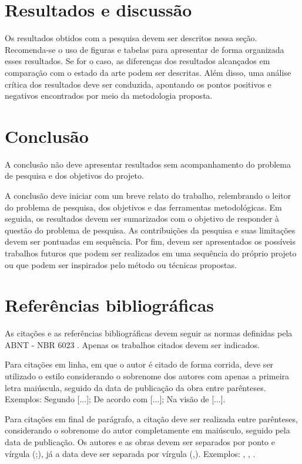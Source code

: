 \documentclass[
	article,			%
	11pt,				%
	oneside,			%
	a4paper,			%
	english,			%
	brazil,				%
	sumario=tradicional
	]{abntex2}
\begin{document}
\section{Resultados e discussão}

Os resultados obtidos com a pesquisa devem ser descritos nessa seção. Recomenda-se o uso de figuras e tabelas para apresentar de forma organizada esses resultados. Se for o caso, as diferenças dos resultados alcançados em comparação com o estado da arte podem ser descritas. Além disso, uma análise crítica dos resultados deve ser conduzida, apontando os pontos positivos e negativos encontrados por meio da metodologia proposta.

\section{Conclusão}

A conclusão não deve apresentar resultados sem acompanhamento do problema de pesquisa e dos objetivos do projeto.

A conclusão deve iniciar com um breve relato do trabalho, relembrando o leitor do problema de pesquisa, dos objetivos e das ferramentas metodológicas. Em seguida, os resultados devem ser sumarizados com o objetivo de responder à questão do problema de pesquisa. As contribuições da pesquisa e suas limitações devem ser pontuadas em sequência. Por fim, devem ser apresentados os possíveis trabalhos futuros que podem ser realizados em uma sequência do próprio projeto ou que podem ser inspirados pelo método ou técnicas propostas.


\section{Referências bibliográficas}

As citações e as referências bibliográficas devem seguir as normas definidas pela ABNT - NBR 6023 \cite{abnt2018}. Apenas os trabalhos citados devem ser indicados.

Para citações em linha, em que o autor é citado de forma corrida, deve ser utilizado o estilo considerando o sobrenome dos autores com apenas a primeira letra maiúscula, seguido da data de publicação da obra entre parênteses. Exemplos: Segundo [...]; De acordo com [...]; Na visão de [...].

Para citações em final de parágrafo, a citação deve ser realizada entre parênteses, considerando o sobrenome do autor completamente em maiúsculo, seguido pela data de publicação. Os autores e as obras devem ser separados por ponto e vírgula (;), já a data deve ser separada por vírgula (,). Exemplos: \cite{szeliski2021}, \cite{russell2021, szeliski2021}, \cite{hameed2019, arora2021, karthik2022}.
\end{document}
